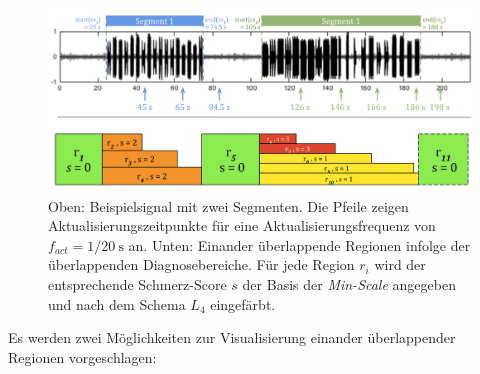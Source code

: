 \begin{figure}[h]
	\centering
	\includegraphics[width=1\textwidth]{bilder/viz-multiple-regions.png}
	\caption[Ein Beispielsignal mit zeitlich einander überlappenden Diagnosebereichen]{Oben: Beispielsignal mit zwei Segmenten. Die Pfeile zeigen Aktualisierungszeitpunkte für eine Aktualisierungsfrequenz von $f_{act} = 1/ \SI{20}{\second}$ an. Unten: Einander überlappende Regionen infolge der überlappenden Diagnosebereiche. Für jede Region $r_i$ wird der entsprechende Schmerz-Score $s$ der Basis der \emph{Min-Scale} angegeben und nach dem Schema $L_4$ eingefärbt.}
	\label{fig:viz_multiple_regions}
\end{figure}

Es werden zwei Möglichkeiten zur Visualisierung einander überlappender Regionen vorgeschlagen:

